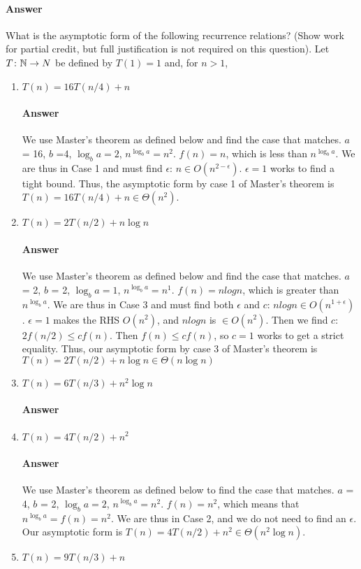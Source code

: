 \documentclass{article}
\begin{document}
\paragraph{Answer}
\todo{}


\collab{\todo{}}

What is the asymptotic form of the following recurrence
relations? (Show work for partial credit, but full justification is not required
on this question).
Let $T \colon {\mathbb N} \to N$ be defined by $T(1)=1$ and, for $n>1$,
\begin{enumerate}
    \item $T(n) = 16 T(n/4) + n$
        \paragraph{Answer}{We use Master's theorem as defined below and find the case that matches. $a$ = 16, $b$ =4, ${\log_b a} = 2$, $n^{\log_b a} = n^2$. $f(n) = n$, which is less than $n^{\log_b a}$. We are thus in Case 1 and must find $\epsilon$: $n \in O(n^{2-\epsilon})$. $\epsilon = 1$ works to find a tight bound. Thus, the asymptotic form by case 1 of Master's theorem is $T(n) = 16 T(n/4) + n \in \Theta(n^2)$.}
    \item $T(n) = 2 T(n/2) + n \log{n}$
        \paragraph{Answer}{We use Master's theorem as defined below and find the case that matches. $a$ = 2, $b$ = 2, ${\log_b a} = 1$, $n^{\log_b a} = n^1$. $f(n) = nlogn$, which is greater than $n^{\log_b a}$. We are thus in Case 3 and must find both $\epsilon$ and $c$: $nlogn \in O(n^{1+\epsilon})$. $\epsilon = 1$ makes the RHS $O(n^2)$, and $nlogn$ is $\in O(n^2)$. Then we find $c$: $2f(n/2) \leq cf(n)$. Then $f(n) \leq cf(n)$, so $c = 1$ works to get a strict equality. Thus, our asymptotic form by case 3 of Master's theorem is $T(n) = 2 T(n/2) + n \log{n} \in \Theta(n \log{n})$}
    \item $T(n) = 6 T(n/3) + n^2 \log{n}$
        \paragraph{Answer} \todo{}
    \item $T(n) = 4 T(n/2) + n^2$
        \paragraph{Answer}{We use Master's theorem as defined below to find the case that matches. $a$ = 4, $b$ = 2, ${\log_b a} = 2$, $n^{\log_b a} = n^2$. $f(n) = n^2$, which means that $n^{\log_b a} = f(n) = n^2$. We are thus in Case 2, and we do not need to find an $\epsilon$. Our asymptotic form is $T(n) = 4 T(n/2) + n^2 \in \Theta(n^2\log{n})$. }
    \item $T(n) = 9 T(n/3) + n$

\end{enumerate}
\end{document}
